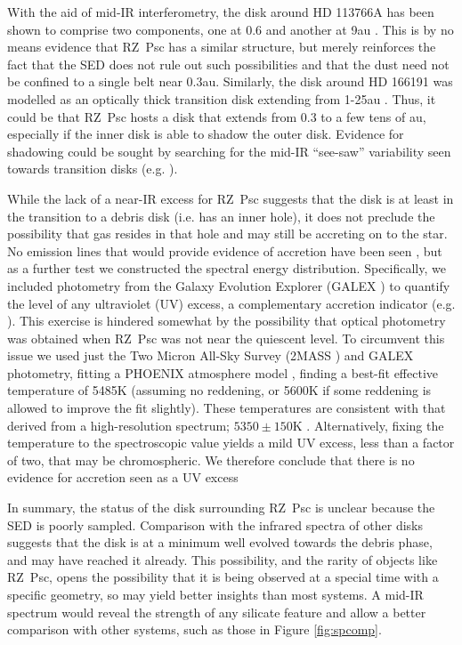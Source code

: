 \documentclass[]{rsos}
\begin{document}
With the aid of mid-IR interferometry, the disk around HD 113766A has been shown to
comprise two components, one at 0.6 and another at 9au \cite{2013A&A...551A.134O}. This
is by no means evidence that RZ~Psc has a similar structure, but merely reinforces the
fact that the SED does not rule out such possibilities and that the dust need not be
confined to a single belt near 0.3au. Similarly, the disk around HD 166191 was modelled
as an optically thick transition disk extending from 1-25au
\cite{2014MNRAS.438.3299K}. Thus, it could be that RZ~Psc hosts a disk that extends from
0.3 to a few tens of au, especially if the inner disk is able to shadow the outer
disk. Evidence for shadowing could be sought by searching for the mid-IR ``see-saw''
variability seen towards transition disks (e.g. \cite{2009ApJ...704L..15M}).

While the lack of a near-IR excess for RZ~Psc suggests that the disk is at least in the
transition to a debris disk (i.e. has an inner hole), it does not preclude the
possibility that gas resides in that hole and may still be accreting on to the star. No
emission lines that would provide evidence of accretion have been seen
\cite{2013Ap.....56..453P,2014A&A...563A.139P}, but as a further test we constructed the
spectral energy distribution. Specifically, we included photometry from the Galaxy
Evolution Explorer (GALEX \cite{2003SPIE.4854..336M}) to quantify the level of any
ultraviolet (UV) excess, a complementary accretion indicator
(e.g. \cite{1998ApJ...509..802C}). This exercise is hindered somewhat by the possibility
that optical photometry was obtained when RZ~Psc was not near the quiescent level. To
circumvent this issue we used just the Two Micron All-Sky Survey (2MASS
\cite{2003tmc..book.....C}) and GALEX photometry, fitting a PHOENIX atmosphere model
\cite{2005ESASP.576..565B}, finding a best-fit effective temperature of 5485K (assuming
no reddening, or 5600K if some reddening is allowed to improve the fit slightly). These
temperatures are consistent with that derived from a high-resolution spectrum;
$5350 \pm 150$K \cite{2014A&A...563A.139P}. Alternatively, fixing the temperature to the
spectroscopic value yields a mild UV excess, less than a factor of two, that may be
chromospheric. We therefore conclude that there is no evidence for accretion seen as a UV
excess

In summary, the status of the disk surrounding RZ~Psc is unclear because the SED is
poorly sampled. Comparison with the infrared spectra of other disks suggests that the
disk is at a minimum well evolved towards the debris phase, and may have reached it
already. This possibility, and the rarity of objects like RZ~Psc, opens the possibility
that it is being observed at a special time with a specific geometry, so may yield better
insights than most systems. A mid-IR spectrum would reveal the strength of any silicate
feature and allow a better comparison with other systems, such as those in Figure
\ref{fig:spcomp}.
\end{document}
